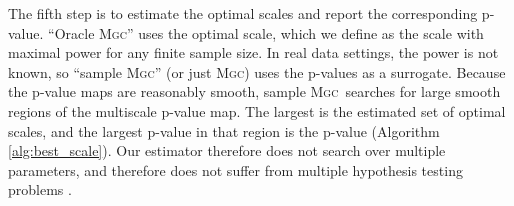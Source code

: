 \documentclass[11pt]{article}
\providecommand{\sct}[1]{{\normalfont\textsc{#1}}}
\newcommand{\Mgc}{\sct{Mgc}}
\begin{document}
The fifth step is to estimate the optimal scales and report the corresponding p-value.  ``Oracle \Mgc'' uses the optimal scale, which we define as the scale with maximal power for any finite sample size. In real data settings, the power is not known, so  ``sample \Mgc'' (or just \Mgc) uses the p-values as a surrogate. 
Because the p-value maps are reasonably smooth, sample \Mgc~searches for large smooth regions of the multiscale p-value map.  The largest is the estimated set of optimal scales, and the largest p-value in that region is the p-value (Algorithm \ref{alg:best_scale}).
Our estimator therefore does not search over multiple parameters, and therefore does not suffer from multiple hypothesis testing problems \cite{Benjamini1995}.
\end{document}
